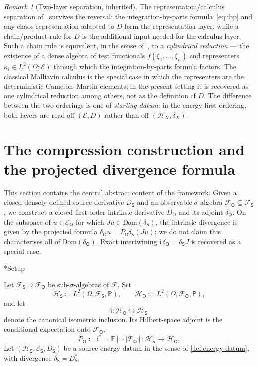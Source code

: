 \documentclass[11pt,reqno]{amsart}
\makeatletter
\renewcommand\subsection{\@startsection{subsection}{2}%
  \z@{.7\linespacing}{.5\linespacing}%
  {\normalfont\centering\scshape}}
\theoremstyle{plain}
\theoremstyle{definition}
\theoremstyle{remark}
\newtheorem{remark}[theorem]{Remark}
\newcommand{\E}{\mathbb{E}}
\newcommand{\Prob}{\mathbb{P}}
\newcommand{\Hilb}{\mathcal{H}}
\newcommand{\Dom}{\mathrm{Dom}}
\newcommand{\Energy}{\mathcal{E}}
\newcommand{\Source}{\mathsf{S}}
\newcommand{\Obs}{\mathsf{O}}
\renewcommand{\iota}{\mathfrak{i}}
\makeatother
\begin{document}
\begin{remark}[Two-layer separation, inherited]\label{rem:two-layer}
The representation/calculus separation
of~\cite{Fontes-OperatorDerivative} survives the reversal: the
integration-by-parts formula~\eqref{eq:ibp} and any chaos
representation adapted to $D$ form the representation layer, while a
chain/product rule for $D$ is the additional input needed for the
calculus layer. Such a chain rule is equivalent, in the sense
of~\cite[Thm.~B]{Fontes-OperatorDerivative}, to a \emph{cylindrical
reduction} --- the existence of a dense algebra of test functionals
$f(\xi_1,\dots,\xi_n)$ and representers $\kappa_i\in L^2(\Omega;\Energy)$
through which the integration-by-parts formula factors. The
classical Malliavin calculus is the special case in which the
representers are the deterministic Cameron--Martin elements; in the
present setting it is recovered as one cylindrical reduction among
others, not as the definition of $D$. The difference between the two
orderings is one of \emph{starting datum}: in the energy-first
ordering, both layers are read off $(\Energy, D)$ rather than off
$(\mathcal H_X, \delta_X)$.
\end{remark}

\section{The compression construction and the projected divergence formula}\label{sec:compat}

This section contains the central abstract content of the framework.
Given a closed densely defined source derivative $D_\Source$ and an
observable $\sigma$-algebra $\mathcal F_\Obs\subseteq\mathcal F_\Source$,
we construct a closed first-order intrinsic derivative $D_\Obs$ and its
adjoint $\delta_\Obs$. On the subspace of $u\in\Energy_\Obs$ for which
$Ju\in\Dom(\delta_\Source)$, the intrinsic divergence is given by the
projected formula $\delta_\Obs u=P_\Obs\delta_\Source(Ju)$; we do not
claim this characterises all of $\Dom(\delta_\Obs)$. Exact
intertwining $\iota\,\delta_\Obs=\delta_\Source J$ is recovered as a
special case.

\subsection*{Setup}

Let $\mathcal F_\Source\supseteq\mathcal F_\Obs$ be sub-$\sigma$-algebras
of $\mathcal F$. Set
\[
  \Hilb_\Source\coloneqq L^2(\Omega,\mathcal F_\Source,\Prob),\qquad
  \Hilb_\Obs\coloneqq L^2(\Omega,\mathcal F_\Obs,\Prob),
\]
and let
\[
  \iota\colon \Hilb_\Obs\hookrightarrow\Hilb_\Source
\]
denote the canonical isometric inclusion. Its Hilbert-space adjoint is
the conditional expectation onto $\mathcal F_\Obs$,
\[
  P_\Obs\coloneqq\iota^{*}=\E[\,\cdot\mid\mathcal F_\Obs]\colon
  \Hilb_\Source\to\Hilb_\Obs.
\]
Let $(\Hilb_\Source,\Energy_\Source,D_\Source)$ be a source energy datum
in the sense of \cref{def:energy-datum}, with divergence
$\delta_\Source=D_\Source^{*}$.
\end{document}
